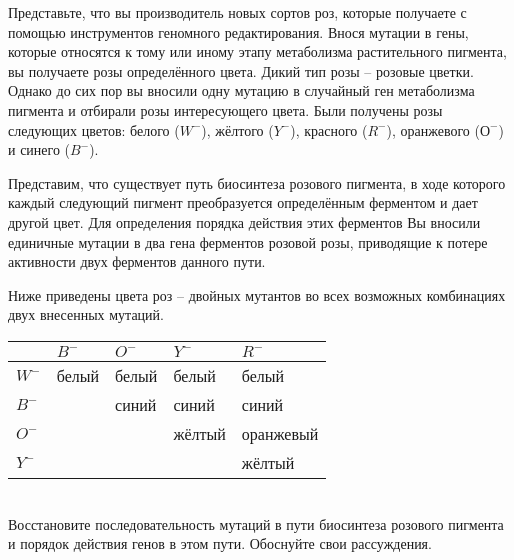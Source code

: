 
Представьте, что вы производитель новых сортов роз, которые получаете с помощью инструментов геномного 
редактирования. Внося мутации в гены, которые относятся к тому или иному этапу метаболизма растительного пигмента, 
вы получаете розы определённого цвета. Дикий тип розы – розовые цветки. Однако до сих пор вы вносили одну мутацию 
в случайный ген метаболизма пигмента и отбирали розы интересующего цвета. Были получены розы следующих цветов: 
белого ($W^-$), жёлтого ($Y^-$), красного ($R^-$), оранжевого ($О^-$) и синего ($B^-$).

Представим, что существует путь биосинтеза розового пигмента, в ходе которого каждый следующий пигмент 
преобразуется определённым ферментом и дает другой цвет. Для определения порядка действия этих ферментов 
Вы вносили единичные мутации в два гена ферментов розовой розы, приводящие к потере активности двух ферментов 
данного пути.

Ниже приведены цвета роз – двойных мутантов во всех возможных комбинациях двух внесенных мутаций.

\begin{tabular}{| l | l | l | l | l |}
    \hline
     & $B^-$ & $O^-$ & $Y^-$ & $R^-$\\
    \hline
    $W^-$ & белый & белый & белый & белый \\
    \hline
    $B^-$ & & синий & синий & синий\\
    \hline
    $O^-$ & & & жёлтый & оранжевый\\
    \hline
    $Y^-$ &  &  & & жёлтый\\
    \hline
\end{tabular}\\

Восстановите последовательность мутаций в пути биосинтеза розового пигмента и порядок действия генов в этом пути. Обоснуйте свои рассуждения.